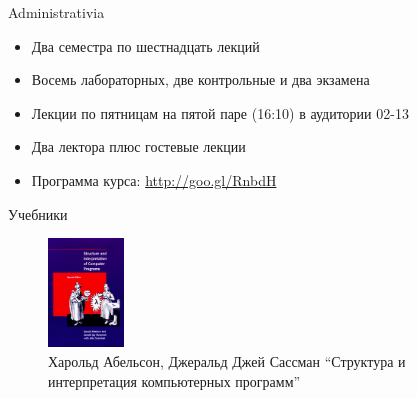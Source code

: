 \documentclass{beamer}
\begin{document}
\begin{frame}{Administrativia}
  \begin{itemize}
  \item Два семестра по шестнадцать лекций
  \item Восемь лабораторных, две контрольные и два экзамена\pause
  \item Лекции по пятницам на пятой паре (16:10) в аудитории 02-13\pause
  \item Два лектора плюс гостевые лекции\pause
  \item Программа курса: \url{http://goo.gl/RnbdH}
  \end{itemize}
\end{frame}

\begin{frame}{Учебники}
  \begin{figure}[h]
    \begin{minipage}[h]{0.49\linewidth}
      \begin{center}
          \includegraphics[width=20mm]{lecture0/SICP.eps}
          \caption{Харольд Абельсон, Джеральд Джей Сассман
            ``Структура и интерпретация компьютерных программ''}
      \end{center}
    \end{minipage}
  \end{figure}
\end{frame}
\end{document}
